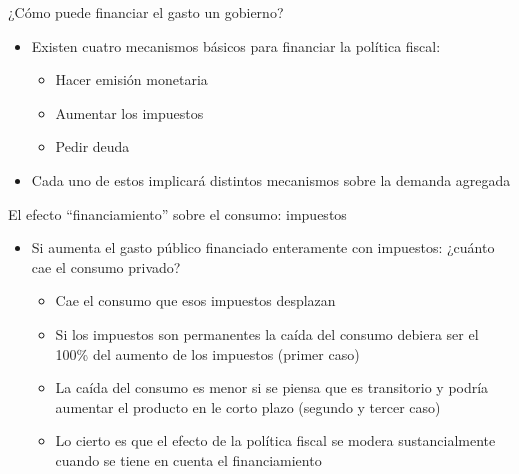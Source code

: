 \documentclass{beamer}
\begin{document}
\begin{frame}{¿Cómo puede financiar el gasto un gobierno?}
    \begin{itemize}
        \item Existen cuatro mecanismos básicos para financiar la política fiscal:
        \begin{itemize}
            \item Hacer emisión monetaria 
            \item Aumentar los impuestos
            \item Pedir deuda
        \end{itemize}
        \vspace{2mm}
        \item Cada uno de estos implicará distintos mecanismos sobre la demanda agregada
    \end{itemize}
\end{frame}


\begin{frame}{El efecto “financiamiento” sobre el consumo: impuestos}
    
    \begin{itemize}
        \item Si aumenta el gasto público financiado enteramente con impuestos: ¿cuánto cae el consumo privado?
        \begin{itemize}
            \item Cae el consumo que esos impuestos desplazan
            \item Si los impuestos son permanentes la caída del consumo debiera ser el 100\% del aumento de los impuestos (primer caso)
            \item La caída del consumo es menor si se piensa que es transitorio y podría aumentar el producto en le corto plazo (segundo y tercer caso)
            \item Lo cierto es que el efecto de la política fiscal se modera sustancialmente cuando se tiene en cuenta el financiamiento
        \end{itemize}
        \end{itemize}

\end{frame}
\end{document}

